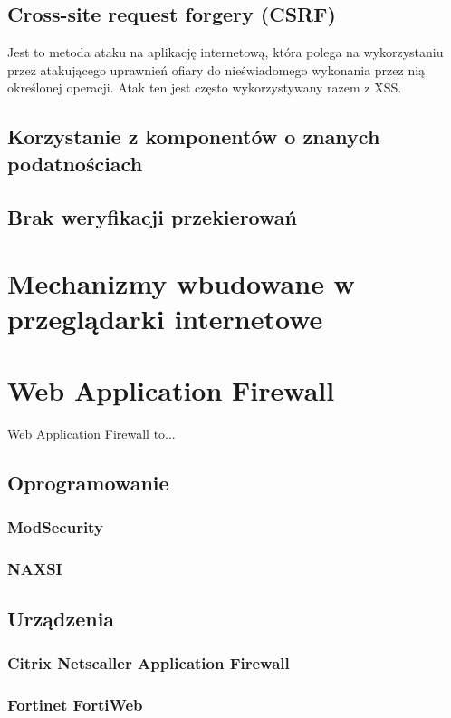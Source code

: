 \documentclass[11pt,a4paper,polish,thesis,oneside]{dcsbook}
\begin{document}
\subsection{Cross-site request forgery (CSRF)}
Jest to metoda ataku na aplikację internetową, która polega na wykorzystaniu przez atakującego uprawnień ofiary do nieświadomego wykonania przez nią określonej operacji. Atak ten jest często wykorzystywany razem z XSS.


\subsection{Korzystanie z komponentów o znanych podatnościach}
\subsection{Brak weryfikacji przekierowań}

\section{Mechanizmy wbudowane w przeglądarki internetowe}


\section{Web Application Firewall}
\label{waf}
Web Application Firewall to...

\subsection{Oprogramowanie}
\subsubsection{ModSecurity}
\subsubsection{NAXSI}

\subsection{Urządzenia}
\subsubsection{Citrix Netscaller Application Firewall}
\subsubsection{Fortinet FortiWeb}
\end{document}

